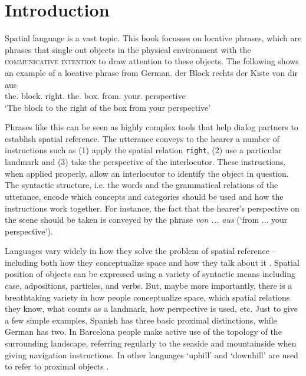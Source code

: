 % 

\chapter{Introduction}
Spatial language is a vast topic. This book focusses on locative phrases, 
which are phrases that single out objects in the physical environment with the 
\textsc{communicative intention} 
to draw attention to these objects. The following shows an example
of a locative phrase from German.
\ea
\label{e:der-block-rechts-der-kiste-von-dir-aus}
\gll der Block rechts der Kiste von dir aus \\
the.{\NOM} block.{\NOM} right.{\PREP} the.{\GEN} box.{\GEN} from.{\PREP} your.{\DAT} perspective \\
\glt `The block to the right of the box from your perspective'\\
\z

Phrases like this can be seen as highly complex tools that help dialog 
partners to establish spatial reference. The utterance conveys to the hearer 
a number of instructions such as (1) apply the spatial relation {\footnotesize\tt right},
(2) use a particular landmark and (3) take the perspective of the interlocutor.
These instructions, when applied properly, allow an interlocutor 
to identify the object in question. The syntactic structure, i.e. the words and the 
grammatical relations of the utterance, encode
which concepts and categories should be used and how the instructions work together. 
For instance, the fact that the hearer's perspective on the scene should be taken
is conveyed by the phrase \textit{von ... aus} (`from ... your perspective').

Languages vary widely in how they solve the problem of spatial reference --
including both how they conceptualize space and how they
talk about it \citep{levinson2006grammars,levinson2003space}. 
Spatial position of objects can be expressed using 
a variety of syntactic means including case, 
adpositions, particles, and verbs. But, maybe more importantly, 
there is a breathtaking variety in how people conceptualize space,
which spatial relations they know, what counts as a landmark, how
perspective is used, etc. Just to give a few simple examples, Spanish has
three basic proximal distinctions, while German has two.
In Barcelona people make active use of the topology of
the surrounding landscape, referring regularly to the
seaside and mountainside when giving navigation instructions. 
In other languages `uphill' and `downhill' 
are used to refer to proximal objects \citep{levinson2003space}.

